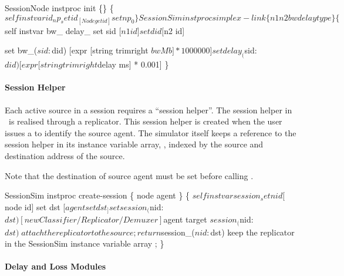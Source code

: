 \begin{program}
SessionNode instproc init \{\} \{
    $self instvar id_ np_
    set id_ [Node getid]
    set np_ 0
\}

SessionSim instproc simplex-link \{ n1 n2 bw delay type \} \{
    $self instvar bw_ delay_
    set sid [$n1 id]
    set did [$n2 id]

    set bw_($sid:$did) [expr [string trimright $bw Mb] * 1000000]
    set delay_($sid:$did) [expr [string trimright $delay ms] * 0.001]
\}
\end{program}

\paragraph{Session Helper}
Each active source in a session requires a ``session helper''.
The session helper in \ns\ is realised through a replicator.
This session helper is created when the user issues a
 to identify the source agent.
The simulator itself keeps a reference to the session helper
in its instance variable array, ,
indexed by the source and destination address of the source.

Note that the destination of source agent must be set before
calling .

\begin{program}
SessionSim instproc create-session \{ node agent \} \{
    $self instvar session_

    set nid [$node id]
    set dst [$agent set dst_]
    set session_($nid:$dst) [new Classifier/Replicator/Demuxer]
    $agent target $session_($nid:$dst) \; attach the replicator to the source;
    return $session_($nid:$dst) \; keep the replicator in the SessionSim instance variable array ;
\}
\end{program}

\paragraph{Delay and Loss Modules}

